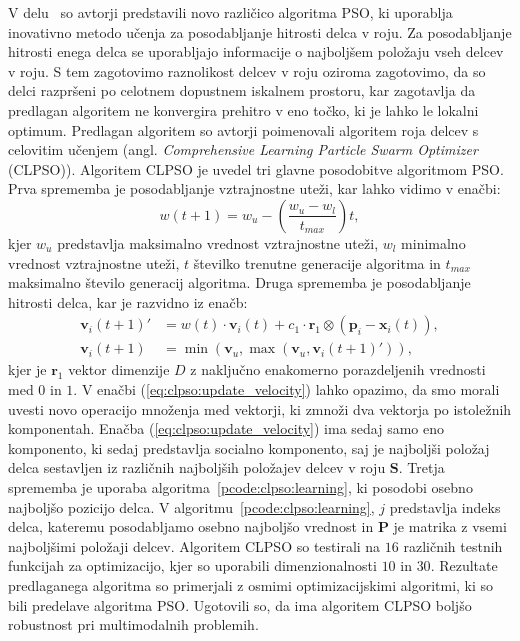 V delu~\cite{alg:clpso} so avtorji predstavili novo različico algoritma PSO, ki uporablja inovativno metodo učenja za posodabljanje hitrosti delca v roju.
Za posodabljanje hitrosti enega delca se uporabljajo informacije o najboljšem položaju vseh delcev v roju.
S tem zagotovimo raznolikost delcev v roju oziroma zagotovimo, da so delci razpršeni po celotnem dopustnem iskalnem prostoru, kar zagotavlja da predlagan algoritem ne konvergira prehitro v eno točko, ki je lahko le lokalni optimum.
Predlagan algoritem so avtorji poimenovali algoritem roja delcev s celovitim učenjem (angl. \textit{Comprehensive Learning Particle Swarm Optimizer} (CLPSO)).
Algoritem CLPSO je uvedel tri glavne posodobitve algoritmom PSO.
Prva sprememba je posodabljanje vztrajnostne uteži, kar lahko vidimo v enačbi:
\begin{equation}
    w(t + 1) = w_u - \left( \frac{w_u - w_l}{t_{max}} \right) t, \label{eq:clpso:w_update}
\end{equation}
kjer $w_u$ predstavlja maksimalno vrednost vztrajnostne uteži, $w_l$ minimalno vrednost vztrajnostne uteži, $t$ številko trenutne generacije algoritma in $t_{max}$ maksimalno število generacij algoritma.
Druga sprememba je posodabljanje hitrosti delca, kar je razvidno iz enačb:
\begin{align}
    \mathbf{v}_i(t + 1)' &= w(t) \cdot \mathbf{v}_i(t) + c_1 \cdot \mathbf{r}_1 \otimes (\mathbf{p}_i - \mathbf{x}_i(t))\label{eq:clpso:update_velocity}, \\
    \mathbf{v}_i(t + 1) &= \min(\mathbf{v}_u, \max(\mathbf{v}_u, \mathbf{v}_i(t + 1)')) \label{eq:clpso:update_velocity_after},
\end{align}
kjer je $\mathbf{r}_1$ vektor dimenzije $\mathit{D}$ z naključno enakomerno porazdeljenih vrednosti med $0$ in $1$.
V enačbi (\ref{eq:clpso:update_velocity}) lahko opazimo, da smo morali uvesti novo operacijo množenja med vektorji, ki zmnoži dva vektorja po istoležnih komponentah.
Enačba (\ref{eq:clpso:update_velocity}) ima sedaj samo eno komponento, ki sedaj predstavlja socialno komponento, saj je najboljši položaj delca sestavljen iz različnih najboljših položajev delcev v roju $\mathbf{S}$.
Tretja sprememba je uporaba algoritma~\ref{pcode:clpso:learning}, ki posodobi osebno najboljšo pozicijo delca.
V algoritmu~\ref{pcode:clpso:learning}, $j$ predstavlja indeks delca, kateremu posodabljamo osebno najboljšo vrednost in $\mathbf{P}$ je matrika z vsemi najboljšimi položaji delcev.
Algoritem CLPSO so testirali na $16$ različnih testnih funkcijah za optimizacijo, kjer so uporabili dimenzionalnosti $10$ in $30$.
Rezultate predlaganega algoritma so primerjali z osmimi optimizacijskimi algoritmi, ki so bili predelave algoritma PSO.
Ugotovili so, da ima algoritem CLPSO boljšo robustnost pri multimodalnih problemih. 


